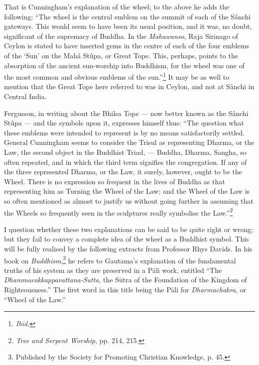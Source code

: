 \documentclass[a4paper, 11pt, oneside, polutonikogreek, english]{article}
\begin{document}
That is Cunningham's explanation of the wheel; to the above he adds the following: ``The wheel is the central emblem on the summit of each of the Sânchi gateways. This would seem to have been its usual position, and it was, no doubt, significant of the supremacy of Buddha. In the \emph{Mahawanso}, Raja Sirinago of Ceylon is stated to have inserted gems in the centre of each of the four emblems of the `Sun' on the Mahá Stûpa, or Great Tope. This, perhaps, points to the absorption of the ancient sun-worship into Buddhism, for the wheel was one of the most common and obvious emblems of the sun.''\footnote{\emph{Ibid.}} It may be as well to mention that the Great Tope here referred to was in Ceylon, and not at Sânchi in Central India.

Fergusson, in writing about the Bhilsa Tope --- now better known as the Sânchi Stûpa --- and the symbols upon it, expresses himself thus: ``The question what these emblems were intended to represent is by no means satisfactorily settled. General Cunningham seems to consider the Trisul as representing Dharma, or the Law, the second object in the Buddhist Triad, --- Buddha, Dharma, Sangha, so often repeated, and in which the third term signifies the congregation. If any of the three represented Dharma, or the Law, it surely, however, ought to be the Wheel. There is no expression so frequent in the lives of Buddha as that representing him as Turning the Wheel of the Law; and the Wheel of the Law is so often mentioned as almost to justify us without going further in assuming that the Wheels so frequently seen in the sculptures really symbolise the Law.''\footnote{\emph{Tree and Serpent Worship}, pp. 214, 215.}

I question whether these two explanations can be said to be quite right or wrong; but they fail to convey a complete idea of the wheel as a Buddhist symbol. This will be fully realised by the following extracts from Professor Rhys Davids. In his book on \emph{Buddhism},\footnote{Published by the Society for Promoting Christian Knowledge, p. 45.} he refers to Gautama's explanation of the fundamental truths of his system as they are preserved in a Pāli work, entitled ``The \emph{Dhammacakkappavattana-Sutta}, the Sūtra of the Foundation of the Kingdom of Righteousness.'' The first word in this title being the Pāli for \emph{Dharmachakra}, or ``Wheel of the Law.''
\end{document}
